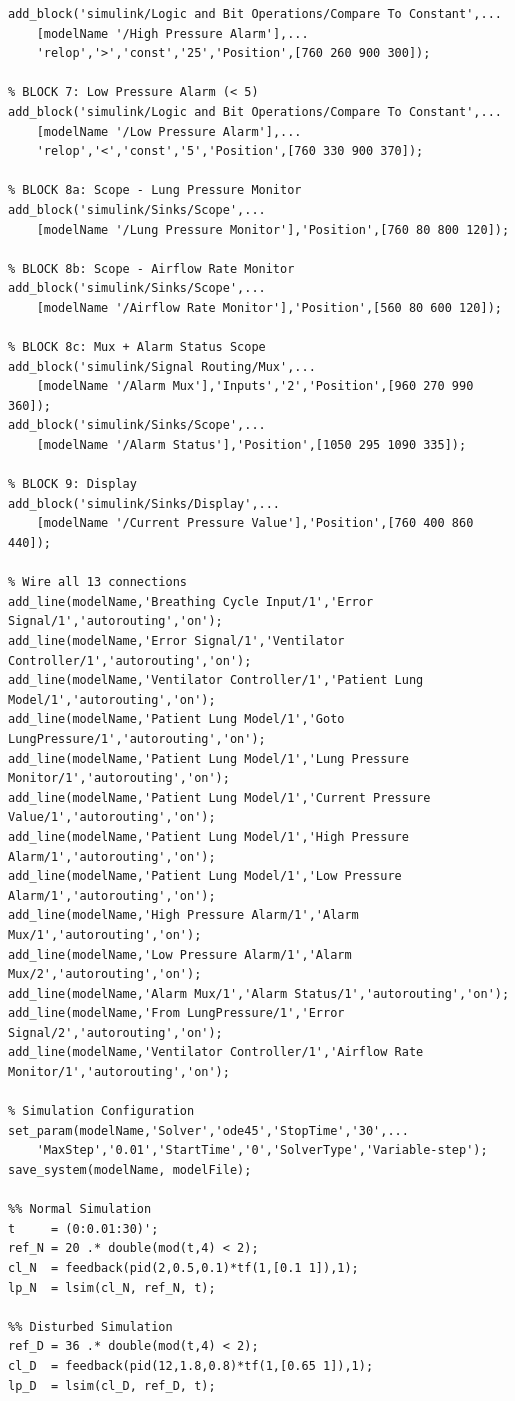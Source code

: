 \documentclass[12pt,a4paper]{article}
\begin{document}
\begin{lstlisting}[style=matlab, caption={Mechanical Ventilator Control System -- MATLAB R2026a}]
% BLOCK 6: High Pressure Alarm (> 25)
add_block('simulink/Logic and Bit Operations/Compare To Constant',...
    [modelName '/High Pressure Alarm'],...
    'relop','>','const','25','Position',[760 260 900 300]);

% BLOCK 7: Low Pressure Alarm (< 5)
add_block('simulink/Logic and Bit Operations/Compare To Constant',...
    [modelName '/Low Pressure Alarm'],...
    'relop','<','const','5','Position',[760 330 900 370]);

% BLOCK 8a: Scope - Lung Pressure Monitor
add_block('simulink/Sinks/Scope',...
    [modelName '/Lung Pressure Monitor'],'Position',[760 80 800 120]);

% BLOCK 8b: Scope - Airflow Rate Monitor
add_block('simulink/Sinks/Scope',...
    [modelName '/Airflow Rate Monitor'],'Position',[560 80 600 120]);

% BLOCK 8c: Mux + Alarm Status Scope
add_block('simulink/Signal Routing/Mux',...
    [modelName '/Alarm Mux'],'Inputs','2','Position',[960 270 990 360]);
add_block('simulink/Sinks/Scope',...
    [modelName '/Alarm Status'],'Position',[1050 295 1090 335]);

% BLOCK 9: Display
add_block('simulink/Sinks/Display',...
    [modelName '/Current Pressure Value'],'Position',[760 400 860 440]);

% Wire all 13 connections
add_line(modelName,'Breathing Cycle Input/1','Error Signal/1','autorouting','on');
add_line(modelName,'Error Signal/1','Ventilator Controller/1','autorouting','on');
add_line(modelName,'Ventilator Controller/1','Patient Lung Model/1','autorouting','on');
add_line(modelName,'Patient Lung Model/1','Goto LungPressure/1','autorouting','on');
add_line(modelName,'Patient Lung Model/1','Lung Pressure Monitor/1','autorouting','on');
add_line(modelName,'Patient Lung Model/1','Current Pressure Value/1','autorouting','on');
add_line(modelName,'Patient Lung Model/1','High Pressure Alarm/1','autorouting','on');
add_line(modelName,'Patient Lung Model/1','Low Pressure Alarm/1','autorouting','on');
add_line(modelName,'High Pressure Alarm/1','Alarm Mux/1','autorouting','on');
add_line(modelName,'Low Pressure Alarm/1','Alarm Mux/2','autorouting','on');
add_line(modelName,'Alarm Mux/1','Alarm Status/1','autorouting','on');
add_line(modelName,'From LungPressure/1','Error Signal/2','autorouting','on');
add_line(modelName,'Ventilator Controller/1','Airflow Rate Monitor/1','autorouting','on');

% Simulation Configuration
set_param(modelName,'Solver','ode45','StopTime','30',...
    'MaxStep','0.01','StartTime','0','SolverType','Variable-step');
save_system(modelName, modelFile);

%% Normal Simulation
t     = (0:0.01:30)';
ref_N = 20 .* double(mod(t,4) < 2);
cl_N  = feedback(pid(2,0.5,0.1)*tf(1,[0.1 1]),1);
lp_N  = lsim(cl_N, ref_N, t);

%% Disturbed Simulation
ref_D = 36 .* double(mod(t,4) < 2);
cl_D  = feedback(pid(12,1.8,0.8)*tf(1,[0.65 1]),1);
lp_D  = lsim(cl_D, ref_D, t);
\end{lstlisting}
\end{document}
